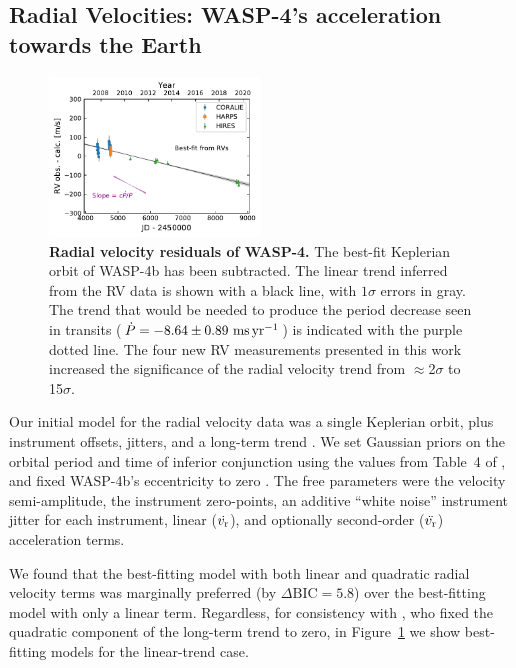 \documentclass[12pt,twocolumn,tighten]{aastex62}
\begin{document}
\subsection{Radial Velocities: WASP-4's acceleration towards the Earth}

\begin{figure}[t]
	\begin{center}
		\leavevmode
		\includegraphics[width=0.5\textwidth]{f2.pdf}
	\end{center}
	\vspace{-0.7cm}
	\caption{
    {\bf Radial velocity residuals of WASP-4.} The best-fit
    Keplerian orbit of WASP-4b has been subtracted.  The linear trend
    inferred from the RV data is shown with a black line, with
    $1\sigma$ errors in gray.  The trend that would be needed to
    produce the period decrease seen in transits ($\dot{P}= - 8.64 \pm
    0.89~{\rm ms}\,{\rm yr}^{-1}$) is indicated with the purple dotted
    line.  The four new RV measurements presented in this work
    increased the significance of the radial velocity trend from
    $\approx$2$\sigma$ to 15$\sigma$.
	\label{fig:rvs}
  \vspace{-0.3cm}
	}
\end{figure}

Our initial model for the radial velocity data was a single Keplerian
orbit, plus instrument offsets, jitters, and a long-term trend
\citep[][\texttt{radvel}]{fulton_radvel_2018}.  We set Gaussian priors
on the orbital period and time of inferior conjunction using the
values from Table~4 of , and fixed
WASP-4b's eccentricity to zero
\citep{beerer_secondary_2011,knutson_friends_2014,bonomo_gaps_2017}.
The free parameters were the velocity semi-amplitude, the instrument
zero-points, an additive ``white noise'' instrument jitter for each
instrument, linear ($\dot{v_{\rm r}}$), and optionally second-order
($\ddot{v_{\rm r}}$) acceleration terms.

We found that the best-fitting model with both linear and quadratic
radial velocity terms was marginally preferred (by $\Delta
\mathrm{BIC} = 5.8$) over the best-fitting model with only a linear
term.  Regardless, for consistency with \citet{knutson_friends_2014},
who fixed the quadratic component of the long-term trend to zero, in
Figure~\ref{fig:rvs} we show best-fitting models for the linear-trend
case.  
\end{document}
